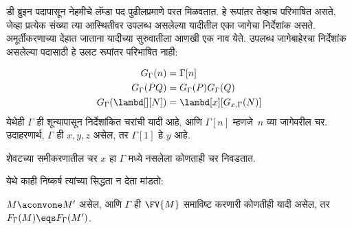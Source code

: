 \documentclass[../../../include/open-logic-section]{subfiles}
\begin{document}
डी ब्रुइन पदापासून नेहमीचे लॅम्डा पद पुढीलप्रमाणे
परत मिळवतात. हे रूपांतर तेव्हाच परिभाषित असते, जेव्हा
प्रत्येक संख्या त्या आस्थितीवर उपलब्ध असलेल्या यादीतील
एका जागेचा निर्देशांक असते. अमूर्तीकरणाच्या देहात
जाताना यादीच्या सुरुवातीला आणखी एक नाव येते.
उपलब्ध जागेबाहेरचा निर्देशांक असलेल्या पदासाठी
हे उलट रूपांतर परिभाषित नाही:

\begin{defn}
  \begin{align*}
    G_\Gamma(n) &= \Gamma[n] \\
    G_\Gamma(PQ) &= G_\Gamma(P) G_\Gamma(Q) \\
    G_\Gamma(\lambd[][N]) &= \lambd[x][G_{x,\Gamma}(N)]
  \end{align*}
  येथेही $\Gamma$ ही शून्यापासून निर्देशांकित चरांची
  यादी आहे, आणि $\Gamma[n]$ म्हणजे~$n$ व्या जागेवरील
  चर. उदाहरणार्थ, $\Gamma$ ही $x,y,z$ असेल, तर
  $\Gamma[1]$ हे $y$ आहे.

  शेवटच्या समीकरणातील चर $x$ हा $\Gamma$ मध्ये
  नसलेला कोणताही चर निवडतात.
\end{defn}

येथे काही निष्कर्ष त्यांच्या सिद्धता न देता मांडतो:

\begin{prop}
  $M \aconvone M'$ असेल, आणि $\Gamma$ ही
  $\FV{M}$ समाविष्ट करणारी कोणतीही यादी असेल,
  तर $F_\Gamma(M) \eqs F_\Gamma(M')$.
\end{prop}
\end{document}
